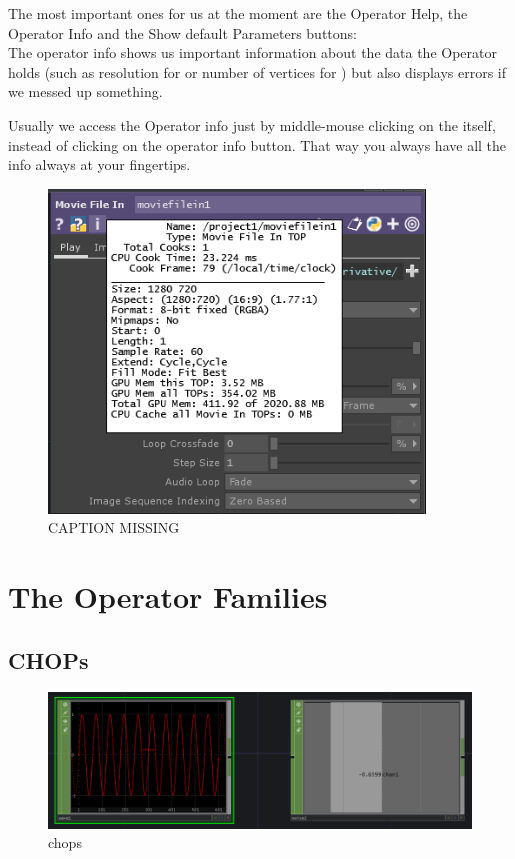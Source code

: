 The most important ones for us at the moment are the Operator Help, the Operator Info and the Show default Parameters buttons: \\
The operator info shows us important information about the data the Operator holds (such as resolution for \TOPs or number of vertices for \SOPs) but also displays errors if we messed up something.\\
\begin{framed}
	Usually we access the Operator info just by middle-mouse clicking on the \OP itself, instead of clicking on the operator info button. That way you always have all the info always at your fingertips.
\end{framed}

\begin{figure}[H]
	\centering
	\includegraphics[width=10cm]{img/info.PNG}
	\caption[shortCaption]
	{CAPTION MISSING}
	\label{fig:label}
\end{figure}








\section{The Operator Families}
\subsection{CHOPs} %
\label{sub:CHOPs}

\begin{figure}[H]
	\begin{center}
		\includegraphics[width = 14cm]{img/chops.png}
		\caption{chops}
		\label{fig:chops}
	\end{center}
\end{figure}

